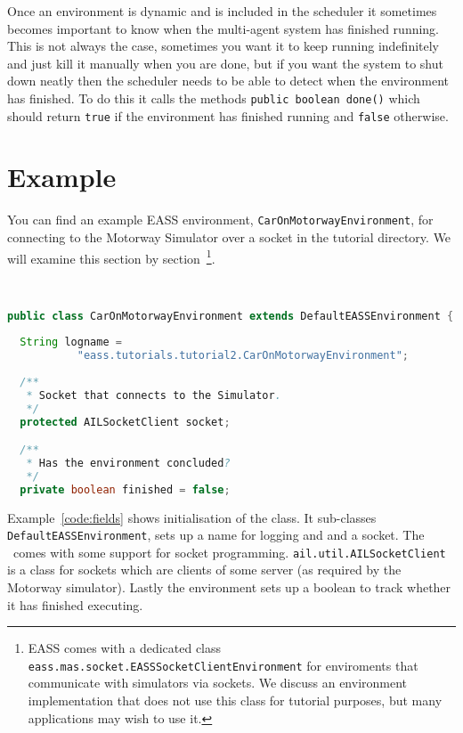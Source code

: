 Once an environment is dynamic and is included in the scheduler it sometimes becomes important to know when the multi-agent system has finished running.  This is not always the case, sometimes you want it to keep running indefinitely and just kill it manually when you are done, but if you want the system to shut down neatly then the scheduler needs to be able to detect when the environment has finished.  To do this it calls the methods \texttt{public boolean done()} which should return \texttt{true} if the environment has finished running and \texttt{false} otherwise.

\section{Example}
You can find an example EASS environment, \texttt{CarOnMotorwayEnvironment}, for connecting to the Motorway Simulator over a socket in the tutorial directory.  We will examine this section by section~\footnote{EASS comes with a dedicated class \texttt{eass.mas.socket.EASSSocketClientEnvironment} for enviroments that communicate with simulators via sockets.  We discuss an environment implementation that does not use this class for tutorial purposes, but many applications may wish to use it.}.

\begin{ourexample}
\label{code:fields} \quad \\
\begin{lstlisting}[basicstyle=\sffamily,language=Java,style=easslisting]
public class CarOnMotorwayEnvironment extends DefaultEASSEnvironment {
  
  String logname = 
           "eass.tutorials.tutorial2.CarOnMotorwayEnvironment";
		
  /**
   * Socket that connects to the Simulator.
   */
  protected AILSocketClient socket;

  /**
   * Has the environment concluded?
   */
  private boolean finished = false;
\end{lstlisting}
\end{ourexample}
Example~\ref{code:fields} shows initialisation of the class.  It sub-classes \texttt{DefaultEASSEnvironment}, sets up a name for logging and and a socket.  The \ail\ comes with some support for socket programming.  \texttt{ail.util.AILSocketClient} is a class for sockets which are clients of some server (as required by the Motorway simulator).  Lastly the environment sets up a boolean to track whether it has finished executing.


